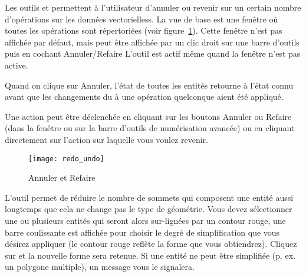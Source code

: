 Les outils  et  permettent à l'utilisateur d'annuler ou revenir sur un certain nombre d'opérations sur les données vectorielless. La vue de base est une fenêtre où toutes les opérations sont répertoriées (voir figure~\ref{fig:vector_redoundo}). Cette fenêtre n'est pas affichée par défaut, mais peut être affichée par un clic droit sur une barre d'outils puis en cochant Annuler/Refaire L'outil est actif même quand la fenêtre n'est pas active.
\par
Quand on clique sur Annuler, l'état de toutes les entités retourne à l'état connu avant que les changements du à une opération quelconque aient été appliqué.
\par
Une action peut être déclenchée en cliquant sur les boutons Annuler ou Refaire (dans la fenêtre ou sur la barre d'outils de numérisation avancée) ou en cliquant directement sur l'action sur laquelle vous voulez revenir.

\begin{figure}[ht]
   \begin{center}   
   \texttt{[image: redo\_undo]}
   \caption{Annuler et Refaire \nixcaption}\label{fig:vector_redoundo}
\end{center}
\end{figure}


L'outil  permet de réduire le nombre de sommets qui composent une entité aussi longtemps que cela ne change pas le type de géométrie. Vous devez sélectionner une ou plusieurs entités qui seront alors sur-lignées par un contour rouge, une barre coulissante est affichée pour choisir le degré de simplification que vous désirez appliquer (le contour rouge reflète la forme que vous obtiendrez). Cliquez sur  et la nouvelle forme sera retenue. Si une entité ne peut être simplifiée (p. ex. un polygone multiple), un message vous le signalera.

